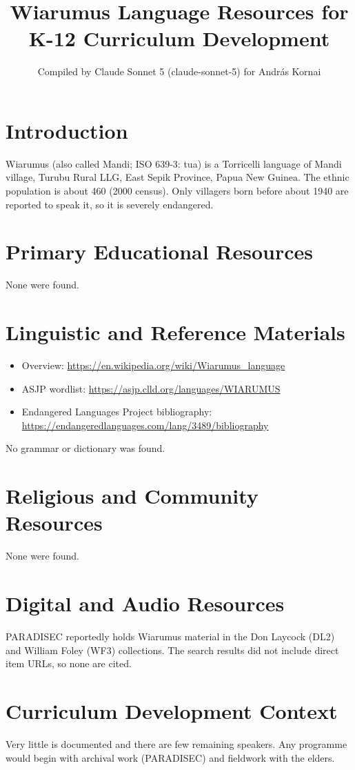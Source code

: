 \documentclass[12pt]{article}
\title{Wiarumus Language Resources for K-12 Curriculum Development}
\author{Compiled by Claude Sonnet 5 (claude-sonnet-5) for Andr\'as Kornai}
\date{}
\begin{document}
\maketitle

\section{Introduction}
Wiarumus (also called Mandi; ISO 639-3: tua) is a Torricelli language of Mandi village, Turubu Rural LLG, East Sepik Province, Papua New Guinea. The ethnic population is about 460 (2000 census). Only villagers born before about 1940 are reported to speak it, so it is severely endangered.

\section{Primary Educational Resources}
None were found.

\section{Linguistic and Reference Materials}
\begin{itemize}
\item Overview: \url{https://en.wikipedia.org/wiki/Wiarumus_language}
\item ASJP wordlist: \url{https://asjp.clld.org/languages/WIARUMUS}
\item Endangered Languages Project bibliography: \url{https://endangeredlanguages.com/lang/3489/bibliography}
\end{itemize}
No grammar or dictionary was found.

\section{Religious and Community Resources}
None were found.

\section{Digital and Audio Resources}
PARADISEC reportedly holds Wiarumus material in the Don Laycock (DL2) and William Foley (WF3) collections. The search results did not include direct item URLs, so none are cited.

\section{Curriculum Development Context}
Very little is documented and there are few remaining speakers. Any programme would begin with archival work (PARADISEC) and fieldwork with the elders.
\end{document}
